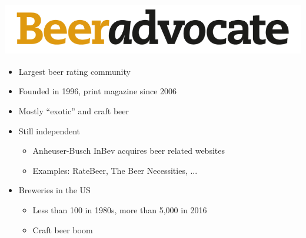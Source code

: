 \begin{frame}
    \frametitle{\includegraphics[scale=0.2]{img/logos/beeradvocate}}
    \vspace{-15pt}
\begin{itemize}
    \item Largest beer rating community
    \item Founded in 1996, print magazine since 2006
    \item Mostly ``exotic'' and craft beer
\end{itemize}
\begin{itemize}
    \item Still independent
    \begin{itemize}
        \item Anheuser-Busch InBev acquires beer related websites
        \item Examples: RateBeer, The Beer Necessities, ...
    \end{itemize}
    \end{itemize}
        \begin{itemize}
    \item Breweries in the US
    \begin{itemize}
        \item Less than 100 in 1980s, more than 5,000 in 2016
        \item Craft beer boom 
    \end{itemize}
\end{itemize}
\end{frame}

